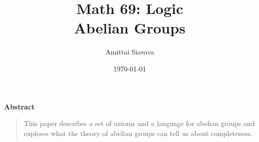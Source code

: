 \title{
  \Huge{Math 69: Logic}\\
  Abelian Groups
}
\date{\Large{\today}}

\begin{titlingpage}

  \author{\Large{Amittai Siavava}}
  \maketitle

  \step
  \begin{center}
    \textbf{Abstract}
  \end{center}
  \step
  \begin{quote}
    \small
    This paper describes a set of axioms and a language for abelian groups
    and explores what the theory of abelian groups can tell us
    about completeness.
  \end{quote}
\end{titlingpage}
